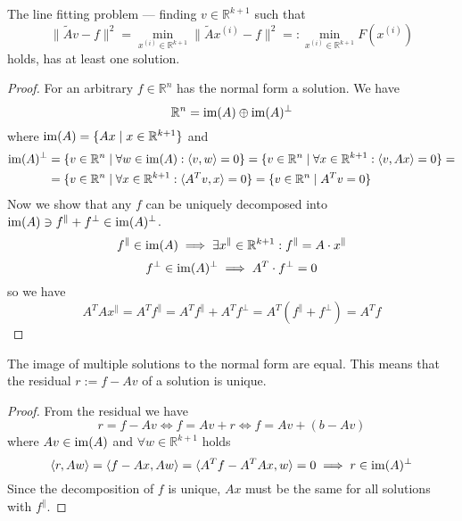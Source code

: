\begin{proposition}
   The line fitting problem --- finding \(v \in \mathbb{R}^{k+1}\) such that
   \[\|\widetilde{A}v - f\|^2 = \min_{x^{(i)} \in \mathbb{R}^{k+1}} \|\widetilde{A}x^{(i)} - f\|^2 =: \min_{x^{(i)} \in \mathbb{R}^{k+1}} F(x^{(i)})\]
   holds, has at least one solution.
\end{proposition}
\begin{proof}
   For an arbitrary \(f \in \mathbb{R}^n\) has the normal form a solution.
   We have
   \[\mathbb{R}^n = \operatorname{im}(A) \oplus \operatorname{im}(A)^\perp\]
   where \(\operatorname{im}(A) = \{Ax \mid x \in \mathbb{R}^{k+1}\}\) and
   \begin{equation*}
      \begin{split}
         \operatorname{im}(A)^\perp & = \{v \in \mathbb{R}^n \mid \forall w \in \operatorname{im}(A): \langle v, w \rangle = 0\} = \{v \in \mathbb{R}^n \mid \forall x \in \mathbb{R}^{k+1}: \langle v, Ax \rangle = 0\} = \\
                      & = \{v \in \mathbb{R}^n \mid \forall x \in \mathbb{R}^{k+1}: \langle A^Tv, x \rangle = 0\} = \{v \in \mathbb{R}^n \mid A^Tv = 0\}
      \end{split}
   \end{equation*}
   Now we show that any \(f\) can be uniquely decomposed into \(\operatorname{im}(A) \ni f^\parallel + f^\perp \in \operatorname{im}(A)^\perp\).
   \[f^\parallel \in \operatorname{im}(A) \implies \exists x^\parallel \in \mathbb{R}^{k+1}: f^\parallel = A \cdot x^\parallel\]
   \[f^\perp \in \operatorname{im}(A)^\perp \implies A^T \cdot f^\perp = 0\]
   so we have
   \[A^TAx^\parallel = A^T f^\parallel = A^T f^\parallel + A^T f^\perp = A^T(f^\parallel + f^\perp) = A^T f\]
\end{proof}

\begin{proposition}
   The image of multiple solutions to the normal form are equal.
   This means that the residual \(r := f - Av\) of a solution is unique.
\end{proposition}
\begin{proof}
   From the residual we have
   \[r = f - Av \iff f = Av + r \iff f = Av + (b - Av)\]
   where \(Av \in \operatorname{im}(A)\) and \(\forall w \in \mathbb{R}^{k+1}\) holds
   \[\langle r, Aw \rangle = \langle f - Ax, Aw \rangle = \langle A^Tf - A^TAx, w \rangle = 0 \implies r \in \operatorname{im}(A)^\perp\]
   Since the decomposition of \(f\) is unique, \(Ax\) must be the same for all solutions with \(f^\parallel\).
\end{proof}


